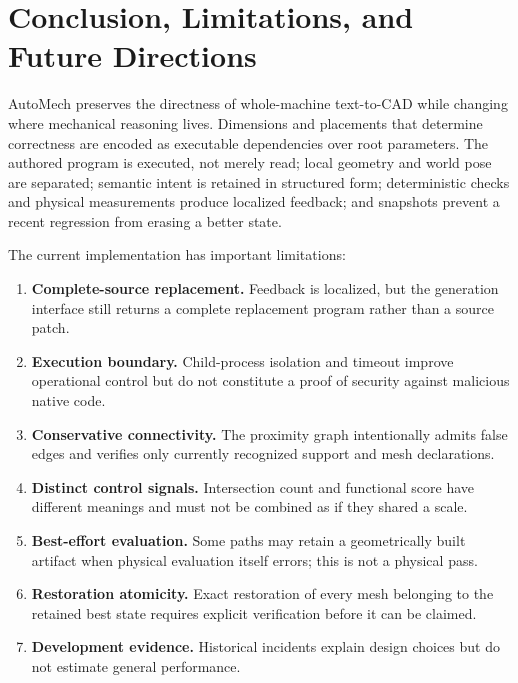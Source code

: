 \documentclass[10pt]{article}
\begin{document}
\section{Conclusion, Limitations, and Future Directions}

AutoMech preserves the directness of whole-machine text-to-CAD while changing where
mechanical reasoning lives. Dimensions and placements that determine correctness are
encoded as executable dependencies over root parameters. The authored program is executed,
not merely read; local geometry and world pose are separated; semantic intent is retained
in structured form; deterministic checks and physical measurements produce localized
feedback; and snapshots prevent a recent regression from erasing a better state.

The current implementation has important limitations:
\begin{enumerate}[leftmargin=*]
  \item \textbf{Complete-source replacement.} Feedback is localized, but the generation
        interface still returns a complete replacement program rather than a source patch.
  \item \textbf{Execution boundary.} Child-process isolation and timeout improve operational
        control but do not constitute a proof of security against malicious native code.
  \item \textbf{Conservative connectivity.} The proximity graph intentionally admits false
        edges and verifies only currently recognized support and mesh declarations.
  \item \textbf{Distinct control signals.} Intersection count and functional score have
        different meanings and must not be combined as if they shared a scale.
  \item \textbf{Best-effort evaluation.} Some paths may retain a geometrically built artifact
        when physical evaluation itself errors; this is not a physical pass.
  \item \textbf{Restoration atomicity.} Exact restoration of every mesh belonging to the
        retained best state requires explicit verification before it can be claimed.
  \item \textbf{Development evidence.} Historical incidents explain design choices but do
        not estimate general performance.
\end{enumerate}
\end{document}
